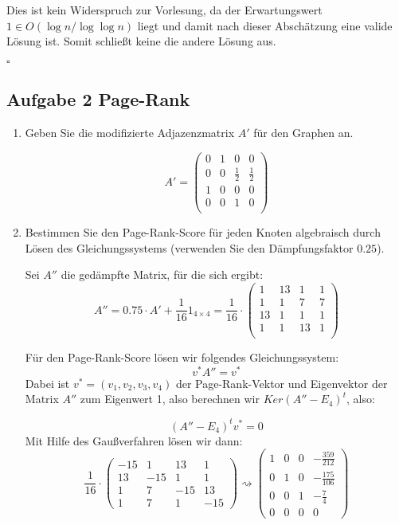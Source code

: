 \documentclass[11pt,a4paper,ngerman]{article}
\begin{document}
\begin{enumerate}[\bfseries a)]
Dies ist kein Widerspruch zur Vorlesung, da der Erwartungswert $1\in O(\log n / \log \log n)$ liegt und damit nach dieser Abschätzung eine valide Lösung ist. Somit schließt keine die andere Lösung aus.

\mbox{}\hfill $\square$
\end{enumerate}


\subsection*{Aufgabe 2 \mdseries Page-Rank}

\begin{enumerate}[\bfseries a)]

\item Geben Sie die modifizierte Adjazenzmatrix $A'$ für den Graphen an.

$$ A' = 
\begin{pmatrix}
 0 & 1 & 0 & 0 \\
 0 & 0 & \frac{1}{2} & \frac{1}{2} \\
 1 & 0 & 0 & 0 \\
 0 & 0 & 1 & 0 \\
\end{pmatrix}
$$

\item Bestimmen Sie den Page-Rank-Score für jeden Knoten algebraisch durch Lösen des Gleichungssystems (verwenden Sie den Dämpfungsfaktor $0.25$).

Sei $A''$ die gedämpfte Matrix, für die sich ergibt:
$$ A'' = 0.75 \cdot A' + \frac{1}{16} 1_{4 \times 4} = \frac{1}{16} \cdot 
\begin{pmatrix}
 1 & 13 & 1 & 1 \\
 1 & 1 & 7 & 7 \\
 13 & 1 & 1 & 1 \\
 1 & 1 & 13 & 1 \\
\end{pmatrix}
$$

Für den Page-Rank-Score lösen wir folgendes Gleichungssystem:
$$ v^{*} A'' = v^{*}$$
Dabei ist $v^{*} = (v_1, v_2, v_3, v_4) $ der Page-Rank-Vektor und Eigenvektor der Matrix $A''$ zum Eigenwert 1, also berechnen wir $Ker(A'' - E_4)^{t}$, also:

$$ (A'' - E_4)^{t} v^{*} = 0 $$
Mit Hilfe des Gaußverfahren lösen wir dann:
$$
\frac{1}{16} \cdot
\begin{pmatrix}
 -15 & 1 & 13 & 1 \\
 13 & -15 & 1 & 1 \\
 1 & 7 & -15 & 13 \\
 1 & 7 & 1 & -15
\end{pmatrix}
  \rightsquigarrow
\begin{pmatrix}
 1 & 0 & 0 & - \frac{359}{212} \\
 0 & 1 & 0 & - \frac{175}{106} \\
 0 & 0 & 1 & - \frac{7}{4} \\
 0 & 0 & 0 & 0
\end{pmatrix}
$$


\end{enumerate}
\end{document}
